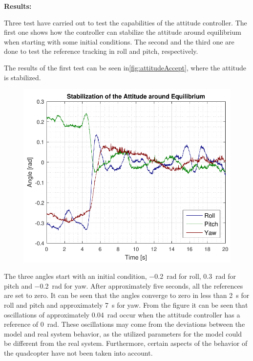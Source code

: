 \textbf{Results:}

Three test have carried out to test the capabilities of the attitude controller. The first one shows how the controller can stabilize the attitude around equilibrium when starting with some initial conditions. The second and the third one are done to test the reference tracking in roll and pitch, respectively.

The results of the first test can be seen in\autoref{fig:attitudeAccept}, where the attitude is stabilized.

\begin{figure}[H]
	\includegraphics[scale=.7]{figures/attitudeAccept.pdf}
	\centering			
	\label{fig:attitudeAccept}
\end{figure} 
%
The three angles start with an initial condition, \SI{-0.2}{rad} for roll, \SI{0.3}{rad} for pitch and \SI{-0.2}{rad} for yaw. After approximately five seconds, all the references are set to zero. It can be seen that the angles converge to zero in less than \SI{2}{s} for roll and pitch and approximately \SI{7}{s} for yaw. From the figure it can be seen that oscillations of approximately \SI{0.04}{rad} occur when the attitude controller has a reference of \SI{0}{rad}. These oscillations may come from the deviations between the model and real system behavior, as the utilized parameters for the model could be different from the real system. Furthermore, certain aspects of the behavior of the quadcopter have not been taken into account.

